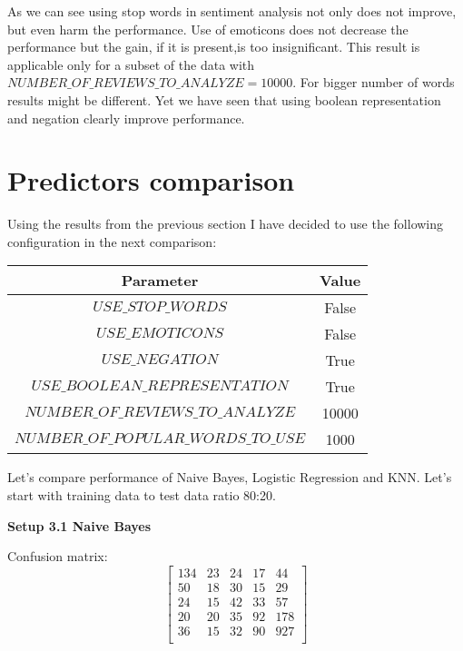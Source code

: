 \documentclass[12pt]{report}
\begin{document}
As we can see using stop words in sentiment analysis not only does not improve, but even harm the performance. Use of emoticons does not decrease the performance but the gain, if it is present,is too insignificant.
This result is applicable only for a subset of the data with $NUMBER\_OF\_REVIEWS\_TO\_ANALYZE = 10000$. For bigger number of words results might be different. Yet we have seen that using boolean representation and negation clearly improve performance.

\newpage


\section{Predictors comparison}

Using the results from the previous section I have decided to use the following configuration in the next comparison:

\begin{center}
	\begin{tabular}{ c | c }
		\hline
		Parameter & Value \\ \hline
		$USE\_STOP\_WORDS$ & False \\ \hline
		$USE\_EMOTICONS$ & False \\ \hline
		$USE\_NEGATION$ & True \\ \hline
		$USE\_BOOLEAN\_REPRESENTATION$ & True \\ \hline
		$NUMBER\_OF\_REVIEWS\_TO\_ANALYZE$ & 10000 \\ \hline
		$NUMBER\_OF\_POPULAR\_WORDS\_TO\_USE$ & 1000 \\ \hline
	\end{tabular}
\end{center}

Let’s compare performance of Naive Bayes, Logistic Regression and KNN.
Let's start with training data to test data ratio 80:20.

\bigbreak

\textbf{Setup 3.1 Naive Bayes}

Confusion matrix:
\[
\begin{bmatrix}
134 & 23 & 24 & 17 & 44 \\
50 & 18 & 30 & 15 & 29 \\
24 & 15 & 42 & 33 & 57 \\
20 & 20 & 35 & 92 & 178 \\
36 & 15 & 32 & 90 & 927 \\
\end{bmatrix}
\]
\end{document}
